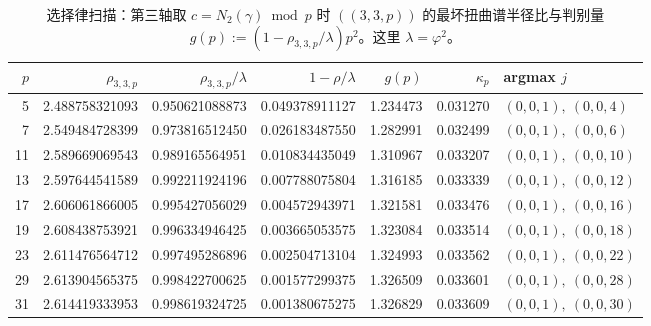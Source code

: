 \begin{table}[H]
\centering
\scriptsize
\setlength{\tabcolsep}{6pt}
\caption{选择律扫描：第三轴取 $c=N_2(\gamma)\bmod p$ 时 $((3,3,p))$ 的最坏扭曲谱半径比与判别量 $g(p):=(1-\rho_{3,3,p}/\lambda)p^2$。这里 $\lambda=\varphi^2$。}
\label{tab:real_input_40_arity_335_n2_selection_law_primes}
\begin{tabular}{r r r r r r l}
\toprule
$p$ & $\rho_{3,3,p}$ & $\rho_{3,3,p}/\lambda$ & $1-\rho/\lambda$ & $g(p)$ & $\kappa_p$ & argmax $j$\\
\midrule
5 & 2.488758321093 & 0.950621088873 & 0.049378911127 & 1.234473 & 0.031270 & $(0,0,1),\ (0,0,4)$\\
7 & 2.549484728399 & 0.973816512450 & 0.026183487550 & 1.282991 & 0.032499 & $(0,0,1),\ (0,0,6)$\\
11 & 2.589669069543 & 0.989165564951 & 0.010834435049 & 1.310967 & 0.033207 & $(0,0,1),\ (0,0,10)$\\
13 & 2.597644541589 & 0.992211924196 & 0.007788075804 & 1.316185 & 0.033339 & $(0,0,1),\ (0,0,12)$\\
17 & 2.606061866005 & 0.995427056029 & 0.004572943971 & 1.321581 & 0.033476 & $(0,0,1),\ (0,0,16)$\\
19 & 2.608438753921 & 0.996334946425 & 0.003665053575 & 1.323084 & 0.033514 & $(0,0,1),\ (0,0,18)$\\
23 & 2.611476564712 & 0.997495286896 & 0.002504713104 & 1.324993 & 0.033562 & $(0,0,1),\ (0,0,22)$\\
29 & 2.613904565375 & 0.998422700625 & 0.001577299375 & 1.326509 & 0.033601 & $(0,0,1),\ (0,0,28)$\\
31 & 2.614419333953 & 0.998619324725 & 0.001380675275 & 1.326829 & 0.033609 & $(0,0,1),\ (0,0,30)$\\
\bottomrule
\end{tabular}
\end{table}
